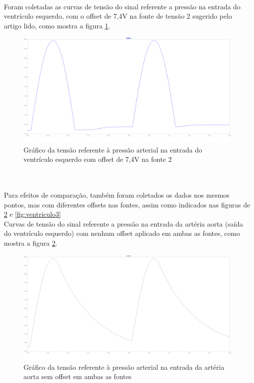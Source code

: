 \documentclass{abntex2}
\begin{document}
\\Foram coletadas as curvas de tensão do sinal referente a pressão na entrada do ventrículo esquerdo, com o offset de 7,4V na fonte de tensão 2 sugerido pelo artigo lido, como mostra a figura \ref{fig:ventriculo1}.

\begin{figure}[h]
  \centering
  \includegraphics[scale = 0.3]{ventriculo_esq_v10_v274.png}
  \caption{Gráfico da tensão referente à pressão arterial na entrada do ventrículo esquerdo com offset de 7,4V na fonte 2}
  \label{fig:ventriculo1}
\end{figure}
\pagebreak
\\\\Para efeitos de comparação, também foram coletados os dados nos mesmos pontos, mas com diferentes offsets nas fontes, assim como indicados nas figuras de \ref{fig:aorta2} e \ref{fig:ventriculo3}
\\Curvas de tensão do sinal referente a pressão na entrada da artéria aorta (saída do ventrículo esquerdo) com nenhum offset aplicado em ambas as fontes, como mostra a figura \ref{fig:aorta2}.

\begin{figure}[h]
  \centering
  \includegraphics[scale = 0.3]{aorta_v10_v20.png}
  \caption{Gráfico da tensão referente à pressão arterial na entrada da artéria aorta sem offset em ambas as fontes}
  \label{fig:aorta2}
\end{figure}
\end{document}
